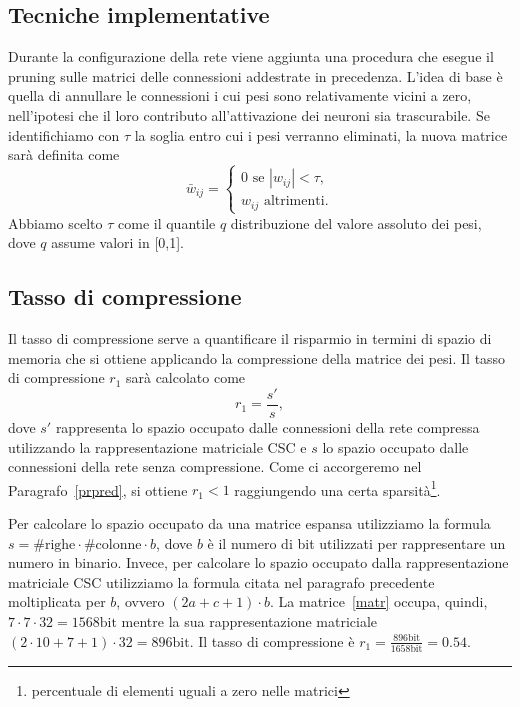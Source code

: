 \documentclass[11pt,a4paper,twoside,
openright]{book}
\begin{document}
\subsection{Tecniche implementative}
\label{percentile}
Durante la configurazione della rete viene aggiunta una procedura che esegue il pruning sulle matrici delle connessioni addestrate in precedenza. L'idea di base è quella di annullare le connessioni i cui pesi sono relativamente vicini a zero, nell'ipotesi che il loro contributo all'attivazione dei neuroni sia trascurabile. Se identifichiamo con $\tau$ la soglia entro cui i pesi verranno eliminati, la nuova matrice sarà definita come
\begin{equation}
\bar{w}_{ij}=
\begin{cases}
0 \text{ se } |w_{ij}|<\tau, \\
w_{ij} \text{ altrimenti}.
\end{cases}
\label{pruning}
\end{equation}
Abbiamo scelto $\tau$ come il quantile $q$  distribuzione del valore assoluto dei pesi, dove $q$ assume valori in [0,1].

\subsection{Tasso di compressione}
\label{sectassopr}
Il tasso di compressione serve a quantificare il risparmio in termini di spazio di memoria che si ottiene applicando la compressione della matrice dei pesi.
Il tasso di compressione $r_1$ sarà calcolato come
\begin{equation}
r_1=\frac{s'}{s},
\label{tassopr}
\end{equation}
dove $s'$ rappresenta lo spazio occupato dalle connessioni della rete compressa utilizzando la rappresentazione matriciale CSC e $s$ lo spazio occupato dalle connessioni della rete senza compressione.
Come ci accorgeremo nel Paragrafo~\ref{prpred}, si ottiene $r_1<1$ raggiungendo una certa sparsità\footnote{percentuale di elementi uguali a zero nelle matrici}.

Per calcolare lo spazio occupato da una matrice espansa utilizziamo la formula $s=\mathrm{\#righe} \cdot \mathrm{\#colonne} \cdot b$, dove $b$ è il numero di bit utilizzati per rappresentare un numero in binario.
Invece, per calcolare lo spazio occupato dalla rappresentazione matriciale CSC utilizziamo la formula citata nel paragrafo precedente moltiplicata per $b$, ovvero $(2a+c+1)\cdot b$.
La matrice~\ref{matr} occupa, quindi, $7 \cdot 7 \cdot 32 = 1568 \mathrm{bit}$ mentre la sua rappresentazione matriciale $(2\cdot10+7+1)\cdot32=896\mathrm{bit}$. Il tasso di compressione è $r_1=\frac{896\mathrm{bit}}{1658\mathrm{bit}}=0.54$.
\end{document}
